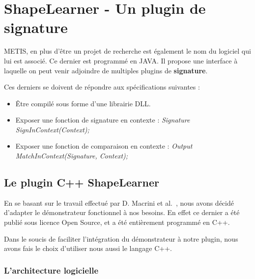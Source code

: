 \section{ShapeLearner - Un plugin de signature}

METIS, en plus d'être un projet de recherche est également le nom du logiciel qui lui est associé. Ce dernier est programmé en JAVA. Il propose une interface à laquelle on peut venir adjoindre de multiples plugins de \textbf{signature}.

Ces derniers se doivent de répondre aux spécifications suivantes :
\begin{itemize}
	\item Être compilé sous forme d'une librairie DLL.
	\item Exposer une fonction de signature en contexte : \textit{Signature SignInContext(Context);}
	\item Exposer une fonction de comparaison en contexte : \textit{Output MatchInContext(Signature, Context);}
\end{itemize}

\subsection{Le plugin C++ ShapeLearner}

En se basant sur le travail effectué par D. Macrini et al.~\cite{Macrini2002}, nous avons décidé d'adapter le démonstrateur fonctionnel à nos besoins. En effet ce dernier a été publié sous licence Open Source, et a été entièrement programmé en C++.

Dans le soucis de faciliter l'intégration du démonstrateur à notre plugin, nous avons fais le choix d'utiliser nous aussi le langage C++.

\subsubsection{L'architecture logicielle}

